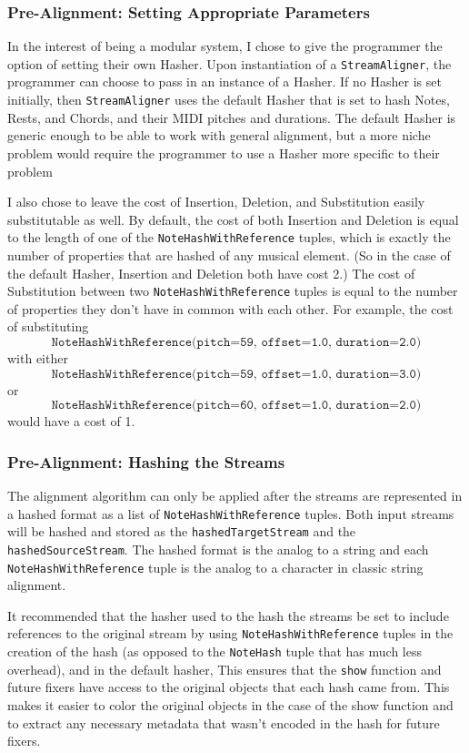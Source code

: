 \subsubsection{Pre-Alignment: Setting Appropriate Parameters}
In the interest of being a modular system, I chose to give the programmer the option of setting their own Hasher. Upon instantiation of a \texttt{StreamAligner}, the programmer can choose to pass in an instance of a Hasher. If no Hasher is set initially, then \texttt{StreamAligner} uses the default Hasher that is set to hash Notes, Rests, and Chords, and their MIDI pitches and durations. The default Hasher is generic enough to be able to work with general alignment, but a more niche problem would require the programmer to use a Hasher more specific to their problem

I also chose to leave the cost of Insertion, Deletion, and Substitution easily substitutable as well. By default, the cost of both Insertion and Deletion is equal to the length of one of the \texttt{NoteHashWithReference} tuples, which is exactly the number of properties that are hashed of any musical element. (So in the case of the default Hasher, Insertion and Deletion both have cost 2.) The cost of Substitution between two \texttt{NoteHashWithReference} tuples is equal to the number of properties they don't have in common with each other. For example, the cost of substituting 
$$ \texttt{NoteHashWithReference(pitch=59, offset=1.0, duration=2.0)} $$
with either 
$$\texttt{NoteHashWithReference(pitch=59, offset=1.0, duration=3.0)} $$ or 
$$\texttt{NoteHashWithReference(pitch=60, offset=1.0, duration=2.0)} $$
would have a cost of 1. 

\subsubsection{Pre-Alignment: Hashing the Streams}
The alignment algorithm can only be applied after the streams are represented in a hashed format as a list of \texttt{NoteHashWithReference} tuples. Both input streams will be hashed and stored as the \texttt{hashedTargetStream} and the \texttt{hashedSourceStream}. The hashed format is the analog to a string and each \texttt{NoteHashWithReference} tuple is the analog to a character in classic string alignment.

It recommended that the hasher used to the hash the streams be set to include references to the original stream by using \texttt{NoteHashWithReference} tuples in the creation of the hash (as opposed to the \texttt{NoteHash} tuple that has much less overhead), and in the default hasher,  This ensures that the \texttt{show} function and future fixers have access to the original objects that each hash came from. This makes it easier to color the original objects in the case of the show function and to extract any necessary metadata that wasn't encoded in the hash for future fixers.

